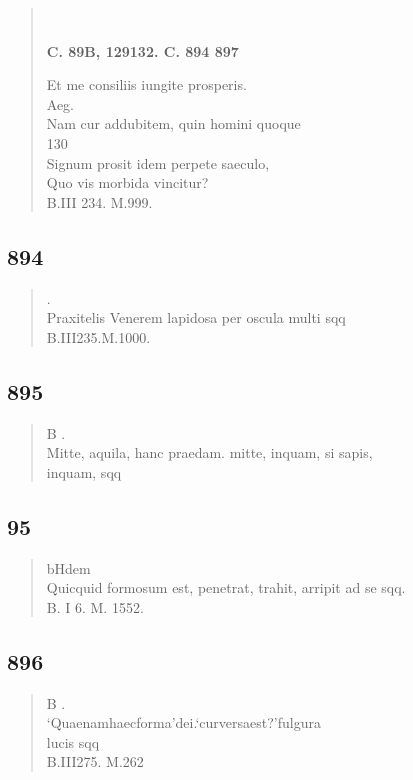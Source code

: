 \documentclass[11pt, a4paper]{report}
\begin{document}
\begin{verse}
        ﻿\pagebreak 
    \begin{center} \textbf{C. 89B, 129132. C. 894 897} \end{center} \marginpar{[339]} Et me consiliis iungite prosperis. \\ Aeg. \\ Nam cur addubitem, quin homini quoque \\ 130 \\ Signum prosit idem perpete saeculo, \\ Quo vis morbida vincitur? \\ B.III 234. M.999. \\ 
      \end{verse}
  
            \subsection*{894}
      \begin{verse}
      . \\ Praxitelis Venerem lapidosa per oscula multi sqq \\ B.III235.M.1000. \\ 
      \end{verse}
  
            \subsection*{895}
      \begin{verse}
      B . \\ Mitte, aquila, hanc praedam. mitte, inquam, si sapis, \\ inquam, sqq \\ 
      \end{verse}
  
            \subsection*{95}
      \begin{verse}
      bHdem \\ Quicquid formosum est, penetrat, trahit, arripit ad se sqq. \\ B. I 6. M. 1552. \\ 
      \end{verse}
  
            \subsection*{896}
      \begin{verse}
      B . \\ ‘Quaenamhaecforma’dei.‘curversaest?’fulgura \\ lucis sqq \\ B.III275. M.262 \\ 
      \end{verse}
  
\end{document}
